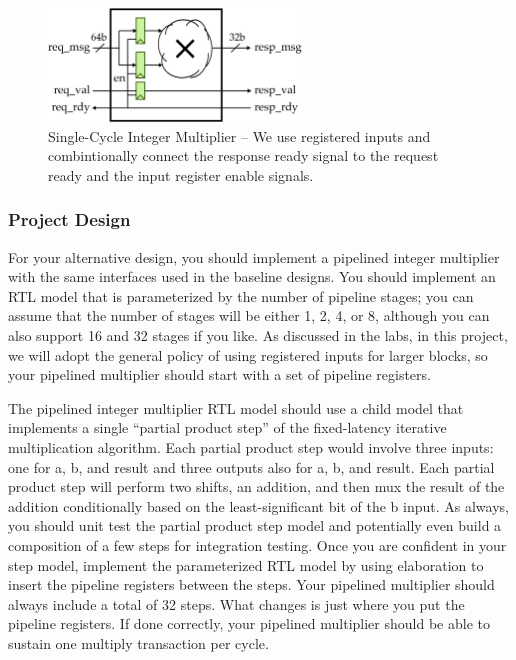 \documentclass[a4paper,12pt,twoside]{article}
\begin{document}
\begin{figure}[H]
    \centering
    \includegraphics[width=0.6\textwidth]{images/22.png}
    \caption{Single-Cycle Integer Multiplier – We use registered inputs and combintionally connect the response ready signal to the request ready and the input register enable signals.}
    \label{F22}
\end{figure}
\subsubsection{Project Design}
For your alternative design, you should implement a pipelined integer multiplier with the same interfaces used in the baseline designs. You should implement an RTL model that is parameterized by the number of pipeline stages; you can assume that the number of stages will be either 1, 2, 4, or 8, although you can also support 16 and 32 stages if you like. As discussed in the labs, in this project, we will adopt the general policy of using registered inputs for larger blocks, so your pipelined multiplier should start with a set of pipeline registers.

The pipelined integer multiplier RTL model should use a child model that implements a single “partial product step” of the fixed-latency iterative multiplication algorithm. Each partial product step would involve three inputs: one for a, b, and result and three outputs also for a, b, and result. Each partial product step will perform two shifts, an addition, and then mux the result of the addition conditionally based on the least-significant bit of the b input. As always, you should unit test the partial product step model and potentially even build a composition of a few steps for integration testing. Once you are confident in your step model, implement the parameterized RTL model by using elaboration to insert the pipeline registers between the steps. Your pipelined multiplier should always include a total of 32 steps. What changes is just where you put the pipeline registers. If done correctly, your pipelined multiplier should be able to sustain one multiply transaction per cycle.
\end{document}
